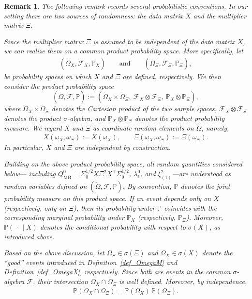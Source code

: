 \documentclass[12pt]{article}
\theoremstyle{plain}
\newtheorem{remark}{Remark}[section]
\numberwithin{equation}{section}
\begin{document}
\begin{remark}
	The following remark records several probabilistic conventions. In our setting there are two sources of randomness: the data matrix $X$ and the multiplier matrix $\Xi$.
	
	Since the multiplier matrix $\Xi$ is assumed to be independent of the data matrix $X$, we can realize them on a common product probability space. More specifically, let
	\begin{align*}
		(\widetilde{\Omega}_X,\mathcal{F}_X,\mathbb{P}_X)
		\qquad \text{and} \qquad
		(\widetilde{\Omega}_{\Xi},\mathcal{F}_{\Xi},\mathbb{P}_{\Xi}),
	\end{align*}
	be probability spaces on which $X$ and $\Xi$ are defined, respectively. We then consider the product probability space
	\[
	(\widetilde{\Omega},\mathcal{F},\mathbb{P})
	:=
	(\widetilde{\Omega}_X \times \widetilde{\Omega}_{\Xi},\ \mathcal{F}_X \otimes \mathcal{F}_{\Xi},\ \mathbb{P}_X \otimes \mathbb{P}_{\Xi}),
	\]
	where $\widetilde{\Omega}_X \times \widetilde{\Omega}_{\Xi}$ denotes the Cartesian product of the two sample spaces, $\mathcal{F}_X \otimes \mathcal{F}_{\Xi}$ denotes the product $\sigma$-algebra, and $\mathbb{P}_X \otimes \mathbb{P}_{\Xi}$ denotes the product probability measure. We regard $X$ and $\Xi$ as coordinate random elements on $\widetilde{\Omega}$, namely,
	\begin{align*}
		X(\omega_X,\omega_{\Xi}) := X(\omega_X),
		\qquad
		\Xi(\omega_X,\omega_{\Xi}) := \Xi(\omega_{\Xi}).
	\end{align*}
	In particular, $X$ and $\Xi$ are independent by construction.
	
	Building on the above product probability space, all random quantities considered below— including $Q_{\mathrm{MB}}^0=\Sigma_0^{1/2}X\Xi^2X^\top \Sigma_0^{1/2}$, $\lambda_1^0$, and $\xi_{(1)}^2$—are understood as random variables defined on $(\widetilde{\Omega},\mathcal{F},\mathbb{P})$. By convention, $\mathbb{P}$ denotes the joint probability measure on this product space.
	If an event depends only on $X$ (respectively, only on $\Xi$), then its probability under $\mathbb{P}$ coincides with the corresponding marginal probability under $\mathbb{P}_X$ (respectively, $\mathbb{P}_{\Xi}$). Moreover, $\mathbb{P}(\,\cdot\,\mid X)$ denotes the conditional probability with respect to $\sigma(X)$, as introduced above. 
	
	Based on the above discussion, let $\Omega_{\Xi} \in \sigma(\Xi)$ and $\Omega_X \in \sigma(X)$ denote the “good” events introduced in Definition~\ref{def_OmegaM} and Definition~\ref{def_OmegaX}, respectively. Since both are events in the common $\sigma$-algebra $\mathcal{F}$, their intersection $\Omega_X \cap \Omega_{\Xi}$ is well defined. Moreover, by independence,
	\begin{align*}
		\mathbb{P}(\Omega_X \cap \Omega_{\Xi})
		=
		\mathbb{P}(\Omega_X)\,\mathbb{P}(\Omega_{\Xi}).
	\end{align*}
\end{remark}
\end{document}
